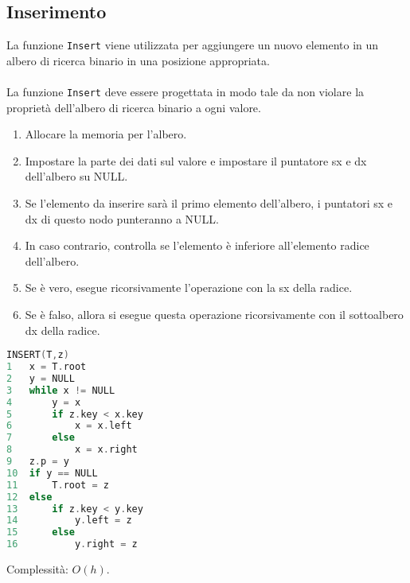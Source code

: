 \subsection{Inserimento}
La funzione \verb|Insert| viene utilizzata per aggiungere un nuovo elemento in un albero di ricerca binario in una posizione appropriata. \\~\\
La funzione \verb|Insert| deve essere progettata in modo tale da non violare la proprietà dell'albero di ricerca binario a ogni valore.
\begin{enumerate}
    \item Allocare la memoria per l'albero.
    \item Impostare la parte dei dati sul valore e impostare il puntatore sx e dx dell'albero su NULL.
    \item Se l'elemento da inserire sarà il primo elemento dell'albero, i puntatori sx e dx di questo nodo punteranno a NULL.
    \item In caso contrario, controlla se l'elemento è inferiore all'elemento radice dell'albero. 
    \item Se è vero, esegue ricorsivamente l'operazione con la sx della radice.
    \item Se è falso, allora si esegue questa operazione ricorsivamente con il sottoalbero dx della radice.
\end{enumerate}
\begin{mdframed}
\begin{lstlisting}[language=C]
INSERT(T,z)
1   x = T.root
2   y = NULL
3   while x != NULL
4       y = x
5       if z.key < x.key
6           x = x.left
7       else
8           x = x.right
9   z.p = y
10  if y == NULL
11      T.root = z
12  else
13      if z.key < y.key
14          y.left = z
15      else
16          y.right = z
\end{lstlisting}
\end{mdframed}
Complessità: $O(h)$.
